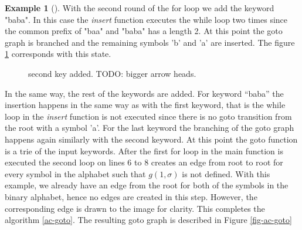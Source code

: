 \documentclass[english,twoside,censored,csm,algorithms-track-2020]{HYthesisML}
\theoremstyle{plain}
\theoremstyle{definition}
\newtheorem{example}[theorem]{Example}
\begin{document}
\begin{example}[]
  With the second round of the for loop we add the keyword "baba". In this case the \textit{insert}
  function executes the while loop two times since the common prefix of "baa" and "baba" has a length
  2. At this point the goto graph is branched and the remaining symbols 'b' and 'a' are inserted. The
  figure \ref{fig-ac-step3} corresponds with this state.

  \begin{figure}[h]
  \centering
  \caption{second key added. TODO: bigger arrow heads.} \label{fig-ac-step3}
\end{figure}

  In the same way, the rest of the keywords are added. For keyword ``baba'' the insertion
  happens in the same way as with the first keyword, that is the while loop in the \textit{insert}
  function is not executed since there is no goto transition from the root with a symbol 'a'.
  For the last keyword the branching of the goto graph happens again
  similarly with the second keyword. At this point the goto function is a trie of the
  input keywords. After the first for loop in the main function is executed
  the second loop on lines 6 to 8 creates an edge from root to root for every symbol in the
  alphabet such that $g(1,\sigma)$ is not defined. With this example, we already have an edge from the
  root for both of the symbols in the binary alphabet, hence no edges are created in this step.
  However, the corresponding edge is drawn to the image for clarity. This completes the
  algorithm \ref{ac-goto}.
  The resulting goto graph is described in Figure \ref{fig-ac-goto}

  \begin{figure}[h]
  \centering
  \begin{tikzpicture}


\end{tikzpicture}
\end{figure}
\end{example}
\end{document}
